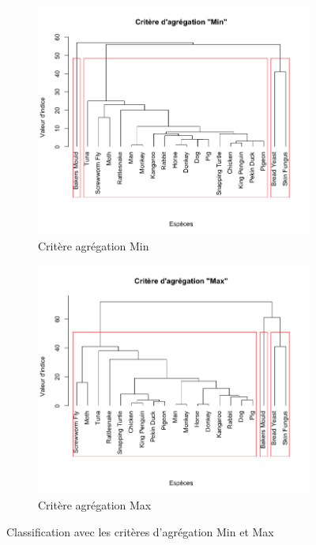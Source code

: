 \documentclass[a4paper,10pt]{report}
\begin{document}
\begin{figure}[H]
	\centering
	\captionsetup{justification=centering, margin=3cm}
	\begin{subfigure}[b]{0.4\linewidth}
		\centering
		\captionsetup{justification=centering}
		\includegraphics[width=1\linewidth]{img/2-1-mut-hierarchie-min}
		\caption{\small Critère agrégation Min}
		\label{fig:2-1-mut-hierarchie-min}
	\end{subfigure}%
	\begin{subfigure}[b]{0.4\linewidth}
		\centering
		\captionsetup{justification=centering}
		\includegraphics[width=1\linewidth]{img/2-1-mut-hierarchie-max}
		\caption{\small Critère agrégation Max}
		\label{fig:2-1-mut-hierarchie-max}
	\end{subfigure}%
	\caption{\small Classification avec les critères d'agrégation Min et Max}
	\label{fig:2-1-classification-mut-min-max}%
\end{figure}
\end{document}
